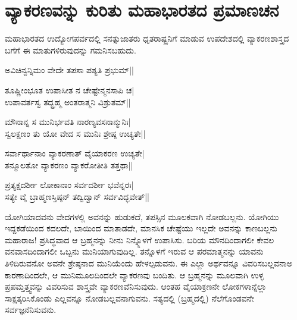 \section*{ವ್ಯಾಕರಣವನ್ನು ಕುರಿತು ಮಹಾಭಾರತದ ಪ್ರಮಾಣಚನ}

ಮಹಾಭಾರತದ ಉದ್ಯೋಗಪರ್ವದಲ್ಲಿ ಸನತ್ಸುಜಾತರು ಧೃತರಾಷ್ಟ್ರನಿಗೆ ಮಾಡುವ ಉಪದೇಶದಲ್ಲಿ ವ್ಯಾಕರಣಶಾಸ್ತ್ರದ ಬಗೆಗೆ ಈ ಮಾತುಗಳಿರುವುದನ್ನು ಗಮನಿಸಬಹುದು.

\begin{shloka}
ಅವಿಚಿನ್ವನ್ನಿಮಂ ವೇದೇ ತಪಸಾ ಪಶ್ಯತಿ ಪ್ರಭುಮ್||\label{34}
\end{shloka}

\begin{shloka}
ತೂಷ್ಣೀಂಭೂತ ಉಪಾಸೀತ ನ ಚೇಷ್ಟೇನ್ಮನಸಾಪಿ ಚ|\\
ಉಪಾವರ್ತಸ್ವ ತದ್ಬ್ರಹ್ಮ ಅಂತರಾತ್ಮನಿ ವಿಶ್ರುತಮ್||
\end{shloka}

\begin{shloka}
ಮೌನಾನ್ನ ಸ ಮುನಿರ್ಭವತಿ ನಾರಣ್ಯವಸನಾನ್ಮುನಿಃ|\\
ಸ್ವಲಕ್ಷಣಂ ತು ಯೋ ವೇದ ಸ ಮುನಿಃ ಶ್ರೇಷ್ಠ ಉಚ್ಯತೇ||
\end{shloka}

\begin{shloka}
ಸರ್ವಾರ್ಥಾನಾಂ ವ್ಯಾಕರಣಾತ್ ವೈಯಾಕರಣ ಉಚ್ಯತೇ|\\
ತನ್ಮೂಲತೋ ವ್ಯಾಕರಣಂ ವ್ಯಾಕರೋತೀತಿ ತತ್ತಥಾ||
\end{shloka}

\begin{shloka}
ಪ್ರತ್ಯಕ್ಷದರ್ಶೀ ಲೋಕಾನಾಂ ಸರ್ವದರ್ಶೀ ಭವೆನ್ನರಃ|\\
ಸತ್ಯೇ ವೈ ಬ್ರಾಹ್ಮಣಸ್ತಿಷ್ಠನ್ ತದ್ವಿದ್ವಾನ್ ಸರ್ವವಿದ್ಭವೇತ್||
\end{shloka}

ಯೋಗಿಯಾದವನು ವೇದಗಳಲ್ಲಿ ಅವನನ್ನು ಹುಡುಕದೆ, ತಪಸ್ಸಿನ ಮೂಲಕವಾಗಿ ನೋಡಬಲ್ಲನು. ಯೋಗಿಯು ಇದ್ದಕಡೆಯಿಂದ ಕದಲದೇ, ಬಾಯಿಂದ ಮಾತಾಡದೇ, ಮಾನಸಿಕ ಚೇಷ್ಟೆಯು ಇಲ್ಲದೇ ಅವನನ್ನು ಕಾಣಬಲ್ಲನು ಮಹಾರಾಜ! ಪ್ರಸಿದ್ಧವಾದ ಆ ಬ್ರಹ್ಮನನ್ನು ನೀನು ನಿನ್ನ್ನೊಳಗೆ ಉಪಾಸಿಸು. ಬರಿಯ ಮೌನದಿಂದಾಗಲೀ ಕೇವಲ ವನವಾಸದಿಂದಾಗಲೀ ಒಬ್ಬನು ಮುನಿಯಾಗುವುದಿಲ್ಲ. ತನ್ನೊಳಗೆ ಇರುವ ಆ ಪರಮಾತ್ಮನನ್ನು ಯಾವನು ತಿಳಿದಿರುವನೋ ಅವನೇ ಶ್ರೇಷ್ಠನಾದ ಮುನಿಯೆಂದು ಹೇಳಲ್ಪಡುವನು. ಈ ಎಲ್ಲಾ ಅರ್ಥವನ್ನೂ ವಿವರಿಸಬಲ್ಲವನಾಅ ಕಾರಣಾದಿಂದಲೇ, ಆ ಮುನಿಮೂಲದಿಂದಲೇ ವ್ಯಾಕರಣವು ಬಂದಿತು. ಆ ಬ್ರಹ್ಮನನ್ನು ಮೂಲವಾಗಿ ಉಳ್ಳ ಪ್ರಪಮ್ತತ್ತ್ವವನ್ನು ವಿವರಿಸುವ ಶಾಸ್ತ್ರವೇ ವ್ಯಾಕರಣವೆನಿಸುವುದು. ಆಂತಹ ವೈಯಾಕ್ರಣನೇ ಲೋಕಗಳಾನ್ನೆಲ್ಲಾ ಸಾಕ್ಷತ್ಕರಿಸಿಕೊಂಡು ಎಲ್ಲವನ್ನೂ ನೋಡಬಲ್ಲವನಾಗುವನು. ಸತ್ಯದಲ್ಲಿ (ಬ್ರಹ್ಮದಲ್ಲಿ) ನೆಲೆಗೊಂಡವನೇ ಸರ್ವಜ್ಞನೆನಿಸುವನು.
